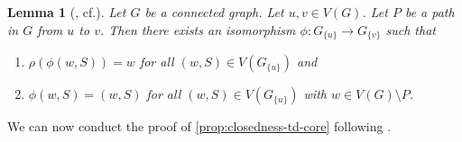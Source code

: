 \documentclass[10pt,a4paper]{article}
\newtheorem{lemma}[theorem]{Lemma}
\begin{document}
\begin{lemma}[{\cite[Lemma~4.3]{neuen_homomorphism-distinguishing_2023}, cf.\@ \cite{dawar_power_2007}}]
	\label{lem:neuen4.3}
	Let $G$ be a connected graph. 
	Let $u, v\in V(G)$. Let $P$ be a path in $G$ from $u$ to $v$.
	Then there exists an isomorphism $\phi \colon G_{\{ u \}} \to G_{\{v\}}$ such that 
	\begin{enumerate}
		\item $\rho(\phi(w, S)) = w$ for all $(w, S) \in V(G_{\{u\}})$ and
		\item $\phi(w, S) = (w, S)$ for all $(w, S) \in V(G_{\{u\}})$ with $w \in V(G) \setminus P$.
	\end{enumerate}
\end{lemma}

We can now conduct the proof of \cref{prop:closedness-td-core} following \cite[Lemma~4.4]{neuen_homomorphism-distinguishing_2023}.
\end{document}
